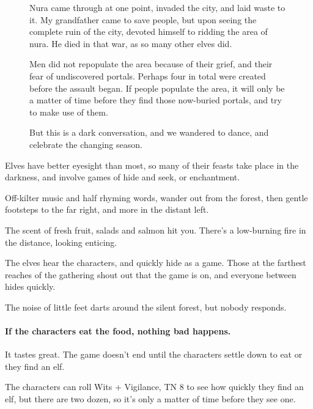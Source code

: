 \begin{multicols}{2}
\begin{figure*}[b]
\begin{speechtext}
  Nura came through at one point, invaded the city, and laid waste to it.  My grandfather came to save people, but upon seeing the complete ruin of the city, devoted himself to ridding the area of nura.  He died in that war, as so many other elves did.

  Men did not repopulate the area because of their grief, and their fear of undiscovered portals.
  Perhaps four in total were created before the assault began.
  If people populate the area, it will only be a matter of time before they find those now-buried portals, and try to make use of them.

  But this is a dark conversation, and we wandered to dance, and celebrate the changing season.

\end{speechtext}
\end{figure*}

Elves have better eyesight than most, so many of their feasts take place in the darkness, and involve games of hide and seek, or enchantment.

\begin{boxtext}

  Off-kilter music and half rhyming words, wander out from the forest, then gentle footsteps to the far right, and more in the distant left.

  The scent of fresh fruit, salads and salmon hit you.  There's a low-burning fire in the distance, looking enticing.

\end{boxtext}

The elves hear the characters, and quickly hide as a game.  Those at the farthest reaches of the gathering shout out that the game is on, and everyone between hides quickly.

\begin{boxtext}

  The noise of little feet darts around the silent forest, but nobody responds.

\end{boxtext}

\paragraph{If the characters eat the food, nothing bad happens.}
It tastes great.
The game doesn't end until the characters settle down to eat or they find an elf.

The characters can roll Wits + Vigilance, TN 8 to see how quickly they find an elf, but there are two dozen, so it's only a matter of time before they see one.


\end{multicols}

